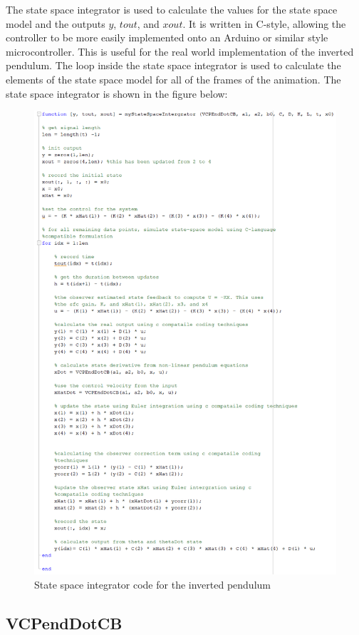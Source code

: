 \documentclass[11pt]{report}
\begin{document}
The state space integrator is used to calculate the values for the state space model and the outputs $y$, $tout$, and $xout$. It is written in C-style, allowing the controller to be more easily implemented onto an Arduino or similar style microcontroller. This is useful for the real world implementation of the inverted pendulum. The loop inside the state space integrator is used to calculate the elements of the state space model for all of the frames of the animation. The state space integrator is shown in the figure below:

\begin{figure}[H]
\centerline{\includegraphics[width=12cm]{myStateSpaceIntergrator.png}}
\caption{State space integrator code for the inverted pendulum}
\label{fig}
\end{figure} 

\subsection{VCPendDotCB}
\end{document}
